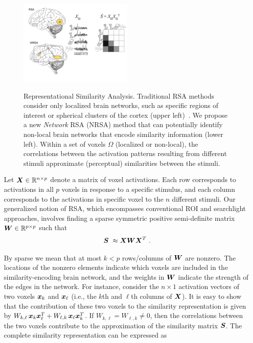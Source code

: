 \begin{figure}[!h]
	\centering
	          \includegraphics[width=0.5\textwidth]{figures/WRSA.pdf} \\

  \caption{Representational Similarity Analysis. Traditional RSA methods consider only
    localized brain networks, such as specific regions of interest or spherical clusters
    of the cortex (upper left)~\cite{RSA,searchlight}. We propose a new {\em Network} RSA
    (NRSA) method that can potentially identify non-local brain networks that encode
  similarity information (lower left). Within a set of voxels $\Omega$ (localized or
non-local), the correlations between the activation patterns resulting from different
stimuli approximate (perceptual) similarities between the stimuli. } \label{Fig:WRSA}
	\label{fig.fitting}
\end{figure}

Let $\boldsymbol{X} \in {\mathbb R}^{n\times p}$ denote a matrix of voxel activations.
Each row corresponds to activations in all $p$ voxels in response to a specific stimulus,
and each column corresponds to the activations in specific voxel to the $n$ different
stimuli. Our generalized notion of RSA, which encompasses conventional ROI \cite{RSA} and
searchlight \cite{searchlight} approaches, involves finding a sparse symmetric positive
semi-definite matrix $\boldsymbol{W}\in {\mathbb R}^{p\times p}$ such that $$\boldsymbol{S} \ \approx \boldsymbol{X} \boldsymbol{W} \boldsymbol{X}^T \
.$$

By sparse we mean that at most $k<p$ rows/columns of $\boldsymbol{W}$ are nonzero. The locations of
the nonzero elements indicate which voxels are included in the similarity-encoding brain
network, and the weights in $\boldsymbol{W}$ indicate the strength of the edges in the network. For
instance, consider the $n\times 1$ activation vectors of two voxels $\boldsymbol{x}_k$ and
$\boldsymbol{x}_{\ell}$ (i.e., the $k$th and $\ell$th columns of $\boldsymbol{X}$). It is easy to show that the
contribution of these two voxels to the similarity representation is given by
$W_{k,\ell} \, \boldsymbol{x}_k \boldsymbol{x}_{\ell}^T + W_{\ell,k} \, \boldsymbol{x}_\ell \boldsymbol{x}_{k}^T$. If
$W_{k,\ell}=W_{\ell,k}\neq 0$, then the correlations between the two voxels contribute to
the approximation of the similarity matrix $\boldsymbol{S}$. The complete similarity representation
can be expressed as

